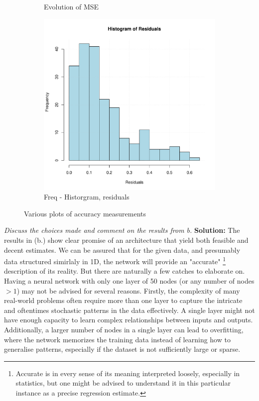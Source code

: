 \begin{figure}[H]
\begin{subfigure}{0.32\textwidth}
  \caption{Evolution of MSE}
  \label{fig:MSE_evol}
\end{subfigure}
\hfill
\begin{subfigure}{0.32\textwidth}
  \centering
  \includegraphics[width=\linewidth]{Images/Figures_Exercise_5/Residual_histo.pdf} 
  \caption{Freq - Historgram, residuals}
  \label{fig:histogram}
\end{subfigure}
\caption{Various plots of accuracy measurements}
\label{fig:three_images}
\end{figure}
\emph{Discuss the choices made and comment on the results from b.} \spaze
\textbf{Solution:} \spaze
The results in (b.) show clear promise of an architecture that yield both feasible and decent estimates. We can be assured that for the given data, and presumably data structured simirlaly in 1D, the network will provide an "accurate" \footnote{Accurate is in every sense of its meaning interpreted loosely, especially in statistics, but one might be advised to understand it in this particular instance as a precise regression estimate.} description of its reality. But there are naturally a few catches to elaborate on. \spaze 
Having a neural network with only one layer of 50 nodes (or any number of nodes $> 1$) may not be advised for several reasons. Firstly, the complexity of many real-world problems often require more than one layer to capture the intricate and oftentimes stochastic patterns in the data effectively. A single layer might not have enough capacity to learn complex relationships between inputs and outputs. Additionally, a larger number of nodes in a single layer can lead to overfitting, where the network memorizes the training data instead of learning how to generalise patterns, especially if the dataset is not sufficiently large or sparse. \spaze 
